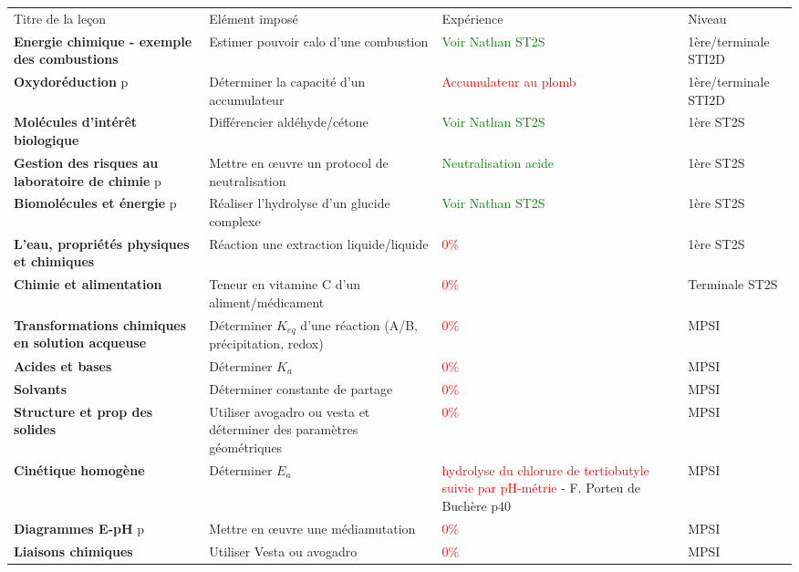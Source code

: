 \begin{changemargin}{-1.5cm}{-0cm}
\begin{tabularx}{\paperwidth-2cm}{| X | X | X | X |}
  \hline
  \rowcolor{gray!20}\multicolumn{4}{c}{Avancement préparation oraux Leçons Chimie} \\
  \hline 
  Titre de la leçon & Elément imposé & Expérience & Niveau \\
  \hline
  \textbf{Energie chimique - exemple des combustions} & Estimer pouvoir calo d'une combustion & \textcolor{green}{Voir Nathan ST2S}  & 1ère/terminale STI2D \\
  \hline
  \textbf{Oxydoréduction} p\pageref{LC_Oxydoreduction_STI2D} & Déterminer la capacité d'un accumulateur & \textcolor{red}{Accumulateur au plomb}  & 1ère/terminale STI2D \\
   \hline  
  \hline
  \textbf{Molécules d'intérêt biologique} & Différencier aldéhyde/cétone & \textcolor{green}{Voir Nathan ST2S} & 1ère ST2S \\
  \hline
  \textbf{Gestion des risques au laboratoire de chimie} p\pageref{LC_GestionRisquesLabo} & Mettre en \oe uvre un protocol de neutralisation & \textcolor{green}{Neutralisation acide} & 1ère ST2S \\
  \hline
   \textbf{Biomolécules et énergie} p\pageref{LC_BiomoleculesEnergie} & Réaliser l'hydrolyse d'un glucide complexe & \textcolor{green}{Voir Nathan ST2S}  & 1ère ST2S \\
  \hline 
  \textbf{L'eau, propriétés physiques et chimiques} & Réaction une extraction liquide/liquide & \textcolor{red}{0\%} & 1ère ST2S \\
  \hline 
  \hline
  \textbf{Chimie et alimentation} & Teneur en vitamine C d'un aliment/médicament & \textcolor{red}{0\%} & Terminale ST2S \\
  \hline
  \hline
  \textbf{Transformations chimiques en solution acqueuse} & Déterminer $K_{eq}$ d'une réaction (A/B, précipitation, redox) & \textcolor{red}{0\%} & MPSI \\
  \hline
  \textbf{Acides et bases} & Déterminer $K_a$ & \textcolor{red}{0\%} & MPSI \\
  \hline
  \textbf{Solvants} & Déterminer constante de partage & \textcolor{red}{0\%} & MPSI \\
  \hline
  \textbf{Structure et prop des solides} & Utiliser avogadro ou vesta et déterminer des paramètres géométriques & \textcolor{red}{0\%} & MPSI \\
  \hline
  \textbf{Cinétique homogène} & Déterminer $E_a$ & \textcolor{red}{hydrolyse du chlorure de tertiobutyle suivie par pH-métrie} - F. Porteu de Buchère p40& MPSI \\
  \hline
  \textbf{Diagrammes E-pH} p\pageref{LC_DiagrammeEpH} & Mettre en \oe uvre une médiamutation & \textcolor{red}{0\%} & MPSI \\
  \hline
  \textbf{Liaisons chimiques} & Utiliser Vesta ou avogadro & \textcolor{red}{0\%} & MPSI \\
  \hline
\end{tabularx}
\end{changemargin}

